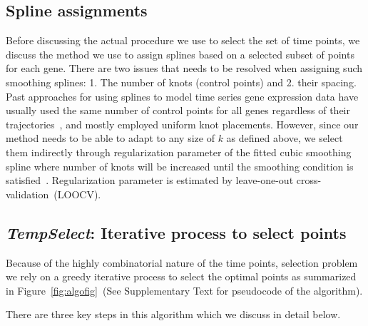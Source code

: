 \documentclass[10pt]{article}
\newcommand{\Tempselect}{\textit{TempSelect}\xspace}
\begin{document}
\subsection{Spline assignments}

Before discussing the actual procedure we use to select the set of
time points, we discuss the method we use to assign splines based on
a selected subset of points for each gene. There are two issues
that needs to be resolved when assigning such smoothing splines: 1.
The number of knots (control points) and 2. their spacing. Past
approaches for using splines to model time series gene expression
data have usually used the same number of control points for all
genes regardless of their trajectories~\cite{bar2012, singh2005}, and mostly employed uniform
knot placements. However, since our method needs to be able to adapt
to any size of $k$ as defined above, we select them indirectly through
regularization parameter of the fitted cubic smoothing spline where number
of knots will be increased until the smoothing condition is
satisfied~\cite{wahba1990}. Regularization parameter is estimated by leave-one-out cross-validation~(LOOCV).

\subsection{\Tempselect: Iterative process to select points}\label{sec:mainalgo}

Because of the highly combinatorial nature of the time points, selection problem we rely on a greedy iterative process to select
the optimal points as summarized in Figure~\ref{fig:algofig}~(See Supplementary Text for pseudocode of the algorithm).

There are three key steps in this algorithm which we discuss in
detail below.
\end{document}
